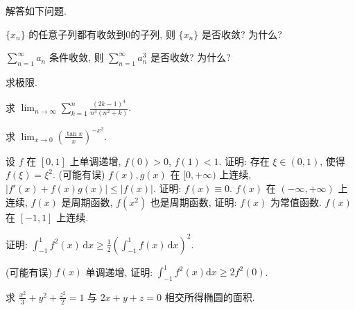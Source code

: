 \par{}
解答如下问题.\par
$\{x_{n}\}$ 的任意子列都有收敛到0的子列, 则 $\{x_{n}\}$ 是否收敛? 为什么?\par
$\sum_{n=1}^{\infty} a_n$ 条件收敛, 则 $\sum_{n=1}^{\infty} a_n^3$ 是否收敛? 为什么?\par
\par{}
求极限.\par
求 $\lim_{n\to \infty}\sum_{k = 1}^{n}\frac{(2k - 1)^4}{n^3(n^2 + k)}.$\par
求 $\lim_{x\to 0}\left(\frac{\tan x}{x}\right)^{-x^2}$.\par
\par{}
设 $f$ 在 $[0,1]$ 上单调递增, $f(0) > 0$, $f(1) < 1$. 证明: 存在 $\xi \in (0,1)$, 使得 $f(\xi) = \xi^2$.
(可能有误) $f(x), g(x)$ 在 $[0, +\infty)$ 上连续, $|f'(x) + f(x)g(x)| \leq |f(x)|$. 证明: $f(x) \equiv 0$.
$f(x)$ 在 $(- \infty, + \infty)$ 上连续, $f(x)$ 是周期函数, $f(x^2)$ 也是周期函数, 证明: $f(x)$ 为常值函数.
$f(x)$ 在 $[-1,1]$ 上连续.\par
证明: $\int_{-1}^{1} f^{2}(x) \, \mathrm{d}x \geq \frac{1}{2} \left( \int_{-1}^{1} f(x) \, \mathrm{d}x \right)^{2}$.\par
(可能有误) $f(x)$ 单调递增, 证明: $\int_{-1}^{1} f^2(x) \mathrm{d}x \geq 2f^2(0)$.\par
\par{}
求 $\frac{x^2}{3} + y^2 + \frac{z^2}{2} = 1$ 与 $2x + y + z = 0$ 相交所得椭圆的面积.\par
\par{}
